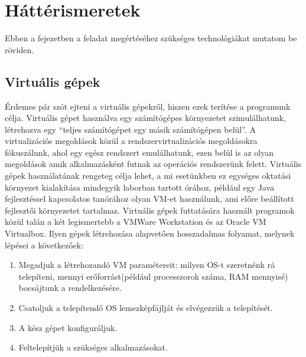 \chapter{Háttérismeretek}
\label{chp:background}
Ebben a fejezetben a feladat megértéséhez szükséges technológiákat mutatom be röviden.

\section{Virtuális gépek}
Érdemes pár szót ejteni a virtuális gépekről, hiszen ezek terítése a programunk célja. Virtuális gépet használva egy számítógépes környezetet szimulálhatunk, létrehozva egy ``teljes számítógépet egy másik számítógépen belül''. A virtualizációs megoldások közül a rendszervirtualizációs megoldásokra fókuszálunk, ahol egy egész rendszert emulálhatunk, ezen belül is az olyan megoldások amik alkalmazásként futnak az operációs rendszerünk felett. Virtuális  gépek használatának rengeteg célja lehet, a mi esetünkben ez egységes oktatási környezet kialakítása mindegyik laborban tartott órához, például egy Java fejlesztéssel kapcsolatos tanórához olyan VM-et használunk, ami előre beállított fejlesztői környezetet tartalmaz.
Virtuális gépek futtatására használt programok közül talán a két legismertebb a VMWare Workstation\cite{vmware} és az Oracle VM Virtualbox\cite{virtualbox}. Ilyen gépek létrehozása alapvetően hosszadalmas folyamat, melynek lépései a következőek:

\begin{enumerate}
  \item Megadjuk a létrehozandó VM paramétereit: milyen OS-t szeretnénk rá telepíteni, mennyi erőforrást(például processzorok száma, RAM mennyisé) bocsájtunk a rendelkezésére.
  \item	Csatoljuk a telepítendő OS lemezképfájlját és elvégezzük a telepítését.
  \item A kész gépet konfiguráljuk.
  \item Feltelepítjük a szükséges alkalmazásokat.
\end{enumerate}

